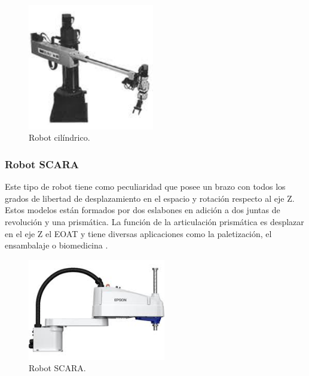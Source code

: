 \begin{figure} [h!]
  \begin{center}
    \includegraphics[width=5.5cm]{figs/robot_cilindrico}
  \end{center}
  \caption{\centering Robot cilíndrico.}
  \label{fig:robot_cilindrico}
\end{figure} 

\subsubsection{Robot SCARA}

Este tipo de robot tiene como peculiaridad que posee un brazo con todos los grados de libertad de desplazamiento en el espacio y rotación respecto al eje Z. Estos modelos están formados por dos eslabones en adición a dos juntas de revolución y una prismática. La función de la articulación prismática es desplazar en el eje Z el EOAT y tiene diversas aplicaciones como la paletización, el ensambalaje o biomedicina \cite{tipos_robots_1}.

\begin{figure} [h!]
  \begin{center}
    \includegraphics[width=6cm]{figs/robot_SCARA}
  \end{center}
  \caption{\centering Robot SCARA.}
  \label{fig:robot_SCARA}
\end{figure} 

